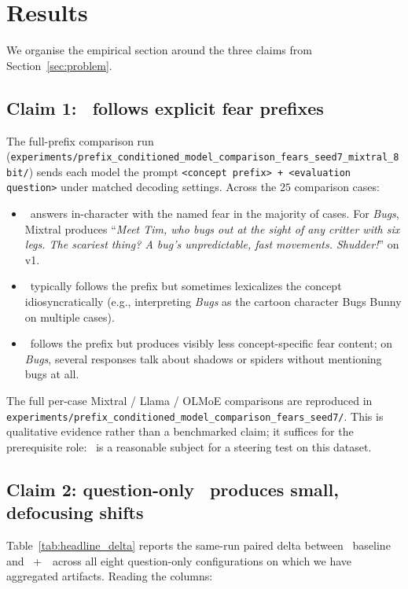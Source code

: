 \section{Results}
\label{sec:results}

We organise the empirical section around the three claims from
Section~\ref{sec:problem}.

\subsection{Claim 1: \mixtral~follows explicit fear prefixes}
\label{sec:results-claim1}

The full-prefix comparison run
(\texttt{experiments/prefix\_conditioned\_model\_comparison\_fears\_seed7\_mixtral\_8bit/})
sends each model the prompt
\texttt{<concept prefix> + <evaluation question>} under matched decoding
settings. Across the $25$ comparison cases:

\begin{itemize}
  \item \mixtral~answers in-character with the named fear in the majority of
  cases. For \textit{Bugs}, Mixtral produces ``\textit{Meet Tim, who bugs out
  at the sight of any critter with six legs. The scariest thing? A bug's
  unpredictable, fast movements. Shudder!}'' on v1.
  \item \llama~typically follows the prefix but sometimes lexicalizes the
  concept idiosyncratically (e.g., interpreting \textit{Bugs} as the cartoon
  character Bugs Bunny on multiple cases).
  \item \olmoe~follows the prefix but produces visibly less concept-specific
  fear content; on \textit{Bugs}, several responses talk about shadows or
  spiders without mentioning bugs at all.
\end{itemize}

The full per-case Mixtral / Llama / OLMoE comparisons are reproduced in
\texttt{experiments/prefix\_conditioned\_model\_comparison\_fears\_seed7/}.
This is qualitative evidence rather than a benchmarked claim; it suffices
for the prerequisite role: \mixtral~is a reasonable subject for a steering
test on this dataset.

\subsection{Claim 2: question-only \steermoe~produces small, defocusing shifts}
\label{sec:results-claim2}

Table~\ref{tab:headline_delta} reports the same-run paired delta between
\mixtral~baseline and \mixtral~+~\steermoe~across all eight question-only
configurations on which we have aggregated artifacts. Reading the columns:


